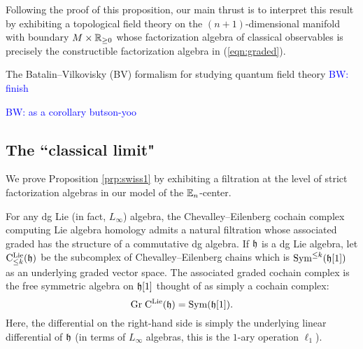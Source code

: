 \documentclass[11pt]{amsart}
\numberwithin{equation}{section}
\def\brian{\textcolor{blue}{BW: }\textcolor{blue}}
\begin{document}
Following the proof of this proposition, our main thrust is to interpret this result by exhibiting a topological field theory on the $(n+1)$-dimensional manifold with boundary $M \times \mathbb R_{\geq 0}$ whose factorization algebra of classical observables is precisely the constructible factorization algebra in (\ref{eqn:graded}). 

The Batalin--Vilkovisky (BV) formalism for studying quantum field theory \brian{finish}

\brian{as a corollary butson-yoo}




\subsection{The ``classical limit"}

We prove Proposition \ref{prp:swiss1} by exhibiting a filtration at the level of strict factorization algebras in our model of the $\mathbb E_n$-center. 

For any dg Lie (in fact, $L_\infty$) algebra, the Chevalley--Eilenberg cochain complex computing Lie algebra homology admits a natural filtration whose associated graded has the structure of a commutative dg algebra.
If $\mathfrak h$ is a dg Lie algebra, let ${\rm C}^{\rm Lie}_{\leq k} (\mathfrak h)$ be the subcomplex of Chevalley--Eilenberg chains which is ${\rm Sym}^{\leq k} (\mathfrak h[1])$ as an underlying graded vector space. 
The associated graded cochain complex is the free symmetric algebra on $\mathfrak h[1]$ thought of as simply a cochain complex:
\[
{\rm Gr} \; {\rm C}^{\rm Lie} (\mathfrak h) = {\rm Sym} (\mathfrak h [1])  .
\]
Here, the differential on the right-hand side is simply the underlying linear differential of $\mathfrak h$ (in terms of $L_\infty$ algebras, this is the $1$-ary operation $\ell_1$). 
\end{document}
